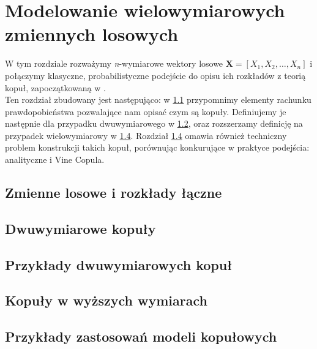 \chapter{Modelowanie wielowymiarowych zmiennych losowych}

W tym rozdziale rozważymy \textit{n}-wymiarowe wektory losowe $\mathbf{X} = [X_1, X_2, \dots, X_n]$ i połączymy klasyczne, probabilistyczne podejście do opisu ich rozkładów z teorią kopuł, zapoczątkowaną w \cite{Sklar_Theorem}.\\
Ten rozdział zbudowany jest następująco: w \ref{sec:rozklady_laczne} przypomnimy elementy rachunku prawdopobieństwa pozwalające nam opisać czym są kopuły. Definiujemy je następnie dla przypadku dwuwymiarowego w \ref{sec:dwuwymiarowe_kopuly}, oraz rozszerzamy definicję na przypadek wielowymiarowy w \ref{sec:kopuly_w_wyzszych_wymiarach}. Rozdział \ref{sec:kopuly_w_wyzszych_wymiarach} omawia również techniczny problem konstrukcji takich kopuł, porównując konkurujące w praktyce podejścia: analityczne i Vine Copula.\\

\section{Zmienne losowe i rozkłady łączne}
\label{sec:rozklady_laczne}


\section{Dwuwymiarowe kopuły}
\label{sec:dwuwymiarowe_kopuly}


\section{Przykłady dwuwymiarowych kopuł}
\label{sec:przyklady_dwuwymiarowych_kopul}


\section{Kopuły w wyższych wymiarach}
\label{sec:kopuly_w_wyzszych_wymiarach}

\section{Przykłady zastosowań modeli kopułowych}
\label{sec:przyklady_zastosowan_modeli_kopulowych}
		
\mgrclosechapter